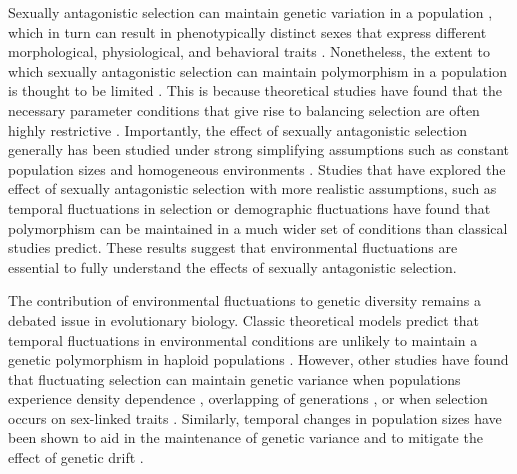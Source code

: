 \documentclass[12pt]{article}
\begin{document}
Sexually antagonistic selection can maintain genetic variation in a population \citep{chippindale2001negative,gavrilets2014sexual}, which in turn can result in phenotypically distinct sexes that express different morphological, physiological, and behavioral traits \citep{mori2017sexual,connallon2018environmental}. Nonetheless,
the extent to which sexually antagonistic selection can maintain polymorphism in a population is thought to be limited \citep{connallon2012general,connallon2018environmental}. This is because theoretical studies have found that the necessary parameter conditions that give rise to balancing selection are often highly restrictive \citep{kidwell1977regions,pamilo1979genic,hedrick1999antagonistic,curtsinger1994antagonistic, patten2010fitness, jordan2012potential}. Importantly, the effect of sexually antagonistic selection generally has been studied under strong simplifying assumptions such as constant population sizes and homogeneous environments  \citep{kidwell1977regions, pamilo1979genic, immler2012ploidally, jordan2012potential}. Studies that have explored the effect of sexually antagonistic selection with more realistic assumptions, such as temporal fluctuations in selection \citep{connallon_evolutionary_2018} or demographic fluctuations \citep{connallon2012general} have found that polymorphism can be maintained in a much wider set of conditions than classical studies predict. These results suggest that environmental fluctuations are essential to fully understand the effects of sexually antagonistic selection.

The contribution of environmental fluctuations to genetic diversity remains a debated issue in evolutionary biology. Classic theoretical models predict that temporal fluctuations in environmental conditions are unlikely to maintain a genetic polymorphism in haploid populations \citep{dempster1955maintenance,hedrick1974genetic,hedrick1986genetic}. However, other studies have found that fluctuating selection can maintain genetic variance when populations experience density dependence \citep{dean2005protecting}, overlapping of generations \citep{ellner1994role, ellner1996patterns}, or when selection occurs on sex-linked traits \citep{reinhold2000maintenance}. Similarly, temporal changes in population sizes have been shown to aid in the maintenance of genetic variance \citep{whitlock1992temporal} and to mitigate the effect of genetic drift \citep{pemberton1996maintenance,nunney2002effective}.
\end{document}
